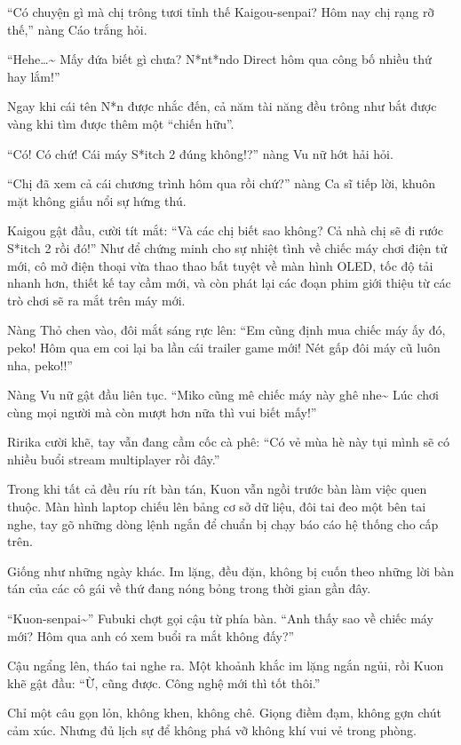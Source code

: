 \documentclass[../main.tex]{subfiles}
\begin{document}
``Có chuyện gì mà chị trông tươi tỉnh thế Kaigou-senpai? Hôm nay chị rạng rỡ thế,'' nàng Cáo trắng hỏi.

``Hehe\dots\~{} Mấy đứa biết gì chưa? N*nt*ndo Direct hôm qua công bố nhiều thứ hay lắm!''

Ngay khi cái tên N*n được nhắc đến, cả năm tài năng đều trông như bắt được vàng khi tìm được thêm một ``chiến hữu''.

``Có! Có chứ! Cái máy S*itch 2 đúng không!?'' nàng Vu nữ hớt hải hỏi.

``Chị đã xem cả cái chương trình hôm qua rồi chứ?'' nàng Ca sĩ tiếp lời, khuôn mặt không giấu nổi sự hứng thú.

Kaigou gật đầu, cười tít mắt: ``Và các chị biết sao không? Cả nhà chị sẽ đi rước S*itch 2 rồi đó!'' Như để chứng minh cho sự nhiệt tình về chiếc máy chơi điện tử mới, cô mở điện thoại vừa thao thao bất tuyệt về màn hình OLED, tốc độ tải nhanh hơn, thiết kế tay cầm mới, và còn phát lại các đoạn phim giới thiệu từ các trò chơi sẽ ra mắt trên máy mới.

Nàng Thỏ chen vào, đôi mắt sáng rực lên: ``Em cũng định mua chiếc máy ấy đó, peko! Hôm qua em coi lại ba lần cái trailer game mới! Nét gấp đôi máy cũ luôn nha, peko!!''

Nàng Vu nữ gật đầu liên tục. ``Miko cũng mê chiếc máy này ghê nhe\~{} Lúc chơi cùng mọi người mà còn mượt hơn nữa thì vui biết mấy!''

Ririka cười khẽ, tay vẫn đang cầm cốc cà phê: ``Có vẻ mùa hè này tụi mình sẽ có nhiều buổi stream multiplayer rồi đây.''

Trong khi tất cả đều ríu rít bàn tán, Kuon vẫn ngồi trước bàn làm việc quen thuộc. Màn hình laptop chiếu lên bảng cơ sở dữ liệu, đôi tai đeo một bên tai nghe, tay gõ những dòng lệnh ngắn để chuẩn bị chạy báo cáo hệ thống cho cấp trên.

Giống như những ngày khác. Im lặng, đều đặn, không bị cuốn theo những lời bàn tán của các cô gái về thứ đang nóng bỏng trong thời gian gần đây.

``Kuon-senpai\~{}'' Fubuki chợt gọi cậu từ phía bàn. ``Anh thấy sao về chiếc máy mới? Hôm qua anh có xem buổi ra mắt không đấy?''

Cậu ngẩng lên, tháo tai nghe ra. Một khoảnh khắc im lặng ngắn ngủi, rồi Kuon khẽ gật đầu: ``Ừ, cũng được. Công nghệ mới thì tốt thôi.''

Chỉ một câu gọn lỏn, không khen, không chê. Giọng điềm đạm, không gợn chút cảm xúc. Nhưng đủ lịch sự để không phá vỡ không khí vui vẻ trong phòng.
\end{document}

